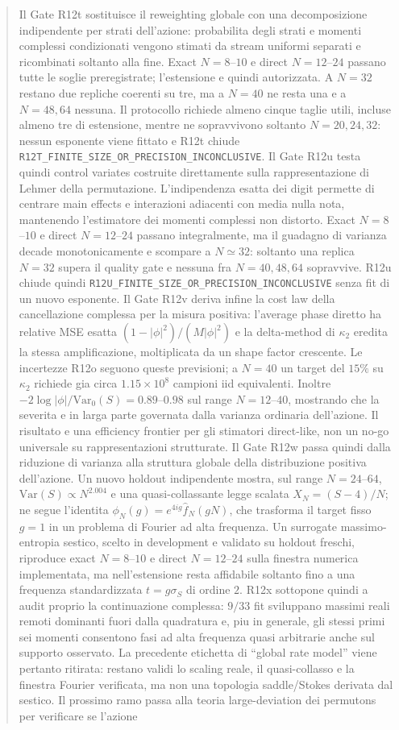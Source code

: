 \documentclass[11pt,a4paper]{article}
\begin{document}
\begin{abstract}
Il Gate R12t sostituisce il reweighting globale con una decomposizione indipendente per strati dell'azione: probabilita degli strati e momenti complessi condizionati vengono stimati da stream uniformi separati e ricombinati soltanto alla fine. Exact $N=8$--$10$ e direct $N=12$--$24$ passano tutte le soglie preregistrate; l'estensione e quindi autorizzata. A $N=32$ restano due repliche coerenti su tre, ma a $N=40$ ne resta una e a $N=48,64$ nessuna. Il protocollo richiede almeno cinque taglie utili, incluse almeno tre di estensione, mentre ne sopravvivono soltanto $N=20,24,32$: nessun esponente viene fittato e R12t chiude \texttt{R12T\_FINITE\_SIZE\_OR\_PRECISION\_INCONCLUSIVE}. Il Gate R12u testa quindi control variates costruite direttamente sulla rappresentazione di Lehmer della permutazione. L'indipendenza esatta dei digit permette di centrare main effects e interazioni adiacenti con media nulla nota, mantenendo l'estimatore dei momenti complessi non distorto. Exact $N=8$--$10$ e direct $N=12$--$24$ passano integralmente, ma il guadagno di varianza decade monotonicamente e scompare a $N\simeq32$: soltanto una replica $N=32$ supera il quality gate e nessuna fra $N=40,48,64$ sopravvive. R12u chiude quindi \texttt{R12U\_FINITE\_SIZE\_OR\_PRECISION\_INCONCLUSIVE} senza fit di un nuovo esponente. Il Gate R12v deriva infine la cost law della cancellazione complessa per la misura positiva: l'average phase diretto ha relative MSE esatta $(1-|\phi|^2)/(M|\phi|^2)$ e la delta-method di $\kappa_2$ eredita la stessa amplificazione, moltiplicata da un shape factor crescente. Le incertezze R12o seguono queste previsioni; a $N=40$ un target del $15\%$ su $\kappa_2$ richiede gia circa $1.15\times10^8$ campioni iid equivalenti. Inoltre $-2\log|\phi|/\mathrm{Var}_0(S)=0.89$--$0.98$ sul range $N=12$--$40$, mostrando che la severita e in larga parte governata dalla varianza ordinaria dell'azione. Il risultato e una efficiency frontier per gli stimatori direct-like, non un no-go universale su rappresentazioni strutturate. Il Gate R12w passa quindi dalla riduzione di varianza alla struttura globale della distribuzione positiva dell'azione. Un nuovo holdout indipendente mostra, sul range $N=24$--$64$, $\mathrm{Var}(S)\propto N^{2.004}$ e una quasi-collassante legge scalata $X_N=(S-4)/N$; ne segue l'identita $\phi_N(g)=e^{4ig}\widehat f_N(gN)$, che trasforma il target fisso $g=1$ in un problema di Fourier ad alta frequenza. Un surrogate massimo-entropia sestico, scelto in development e validato su holdout freschi, riproduce exact $N=8$--$10$ e direct $N=12$--$24$ sulla finestra numerica implementata, ma nell'estensione resta affidabile soltanto fino a una frequenza standardizzata $t=g\sigma_S$ di ordine $2$. R12x sottopone quindi a audit proprio la continuazione complessa: $9/33$ fit sviluppano massimi reali remoti dominanti fuori dalla quadratura e, piu in generale, gli stessi primi sei momenti consentono fasi ad alta frequenza quasi arbitrarie anche sul supporto osservato. La precedente etichetta di ``global rate model'' viene pertanto ritirata: restano validi lo scaling reale, il quasi-collasso e la finestra Fourier verificata, ma non una topologia saddle/Stokes derivata dal sestico. Il prossimo ramo passa alla teoria large-deviation dei permutons per verificare se l'azione 
\end{abstract}
\end{document}
